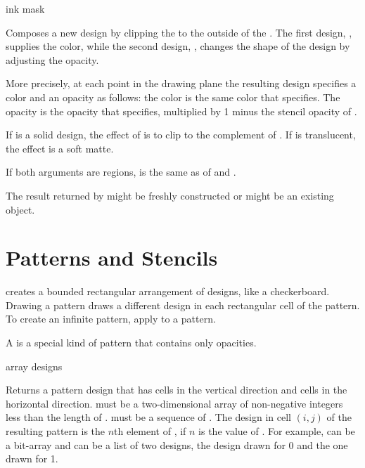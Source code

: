  {ink mask}

Composes a new design by clipping the   to the outside of
the  .  The first design, , supplies the color,
while the second design, , changes the shape of the design by
adjusting the opacity.

More precisely, at each point in the drawing plane the resulting design
specifies a color and an opacity as follows: the color is the same color that
 specifies.  The opacity is the opacity that  specifies,
multiplied by 1 minus the stencil opacity of .

If  is a solid design, the effect of  is to clip
 to the complement of .  If  is translucent, the
effect is a soft matte.

If both arguments are regions,  is the same as
 of  and .

\MayCaptureInputs
The result returned by  might be freshly constructed or might be
an existing object.


\section {Patterns and Stencils}

 creates a bounded rectangular arrangement of designs, like
a checkerboard.  Drawing a pattern draws a different design in each rectangular
cell of the pattern.  To create an infinite pattern, apply
 to a pattern.

A  is a special kind of pattern that contains only opacities.

 {array designs}

Returns a pattern design that has  cells in
the vertical direction and  cells in the
horizontal direction.   must be a two-dimensional array of
non-negative integers less than the length of .   must
be a sequence of .  The design in cell $(i,j)$ of the resulting
pattern is the $n$th element of , if $n$ is the value of .  For example,  can be a bit-array and
 can be a list of two designs, the design drawn for 0 and the one
drawn for 1.

